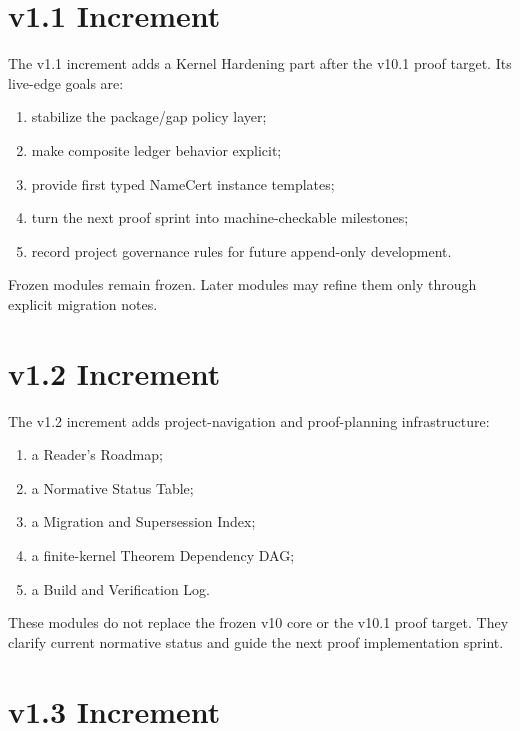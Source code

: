 \section*{v1.1 Increment}

The v1.1 increment adds a Kernel Hardening part after the v10.1 proof target. Its live-edge goals are:
\begin{enumerate}
  \item stabilize the package/gap policy layer;
  \item make composite ledger behavior explicit;
  \item provide first typed NameCert instance templates;
  \item turn the next proof sprint into machine-checkable milestones;
  \item record project governance rules for future append-only development.
\end{enumerate}

Frozen modules remain frozen. Later modules may refine them only through explicit migration notes.


\section*{v1.2 Increment}

The v1.2 increment adds project-navigation and proof-planning infrastructure:
\begin{enumerate}
  \item a Reader's Roadmap;
  \item a Normative Status Table;
  \item a Migration and Supersession Index;
  \item a finite-kernel Theorem Dependency DAG;
  \item a Build and Verification Log.
\end{enumerate}
These modules do not replace the frozen v10 core or the v10.1 proof target. They clarify current normative status and guide the next proof implementation sprint.


\section*{v1.3 Increment}

